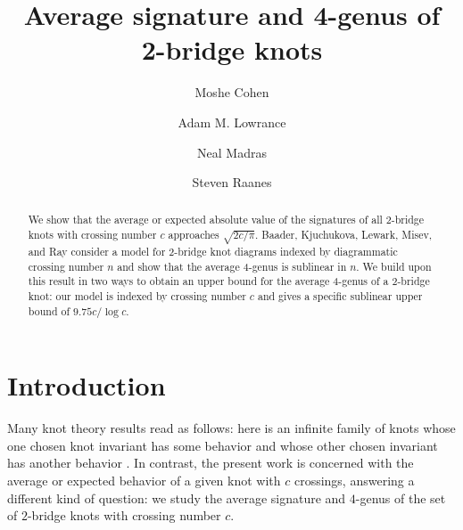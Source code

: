 \documentclass[12pt]{amsart}
\theoremstyle{definition}
\theoremstyle{remark}
\numberwithin{equation}{section}
\begin{document}
\title{Average signature and 4-genus of 2-bridge knots}

\author{Moshe Cohen}
\address{Mathematics Department, State University of New York at New Paltz, New Paltz, NY 12561}

\author{Adam M. Lowrance}
\address{Department of Mathematics and Statistics, Vassar College, Poughkeepsie, NY 12604}

\author{Neal Madras}
\address{Department of Mathematics and Statistics, York University, Toronto, ON M3J 1P3}

\author{Steven Raanes}
\address{Department of Mathematics, The Ohio State University, Columbus, OH 43210}


\begin{abstract}
We show that the average or expected absolute value of the signatures of all 2-bridge knots with crossing number $c$ approaches $\sqrt{{2c}/{\pi}}$.  
Baader, Kjuchukova, Lewark, Misev, and Ray consider a model for 2-bridge knot diagrams indexed by diagrammatic crossing number $n$ and show that the average 4-genus is sublinear in $n$.  We build upon this result in two ways to obtain an upper bound for the average 4-genus of a 2-bridge knot:  our model is indexed by crossing number $c$ and gives a specific sublinear upper bound of $9.75c/\log c$.
\end{abstract}


\maketitle


\section{Introduction}
\label{sec:intro}

Many knot theory results read as follows:  here is an infinite family of knots whose one chosen knot invariant has some behavior and whose other chosen invariant has another behavior \cite{DiaErnThi,BriJen, LudEvaPaa, LowAltDist,BakMot,Mis,FucPurSte}.  In contrast, the present work is concerned with the average or expected behavior of a given knot with $c$ crossings, answering a different kind of question: we study the average signature and $4$-genus of the set of $2$-bridge knots with crossing number $c$.
\end{document}
